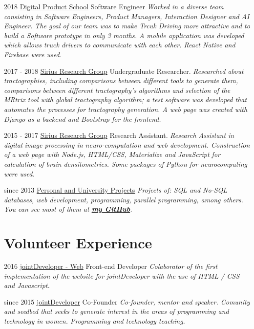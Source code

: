 \documentclass[]{friggeri-cv}
\begin{document}
\begin{entrylist}

    \entry
    {2018}
    {\href{https://www.digitalproductschool.io/index}{Digital Product School}}
    {Software Engineer}
    {\emph{Worked in a diverse team consisting in Software Engineers, Product Managers, Interaction Designer and  AI Engineer. The goal of our team was to make Trcuk Driving more attractive and to build a Software prototype in only 3 months.
    A mobile application was developed which allows truck drivers to communicate with each other. React Native and Firebase were used.
    }}
    
    \entry
    {2017 - 2018}
    {\href{http://judge.utp.edu.co/}{Sirius Research Group}}
    {Undergraduate Researcher.}
    {\emph{
    Researched about tractographies, including comparisons between different tools to generate them, comparisons between different tractography's algorithms and selection of the MRtrix tool with global tractography algorithm; a test software was developed that automates the processes for tractography generation. A web page was created with Django as a backend and Bootstrap for the frontend.
    }}
    
  \entry
    {2015 - 2017}
    {\href{http://judge.utp.edu.co/}{Sirius Research Group}}
    {Research Assistant.}
    {\emph{Research Assistant in digital image processing in neuro-computation and web development.
    Construction of a web page with Node.js, HTML/CSS, Materialize and JavaScript for calculation of brain densitometries. Some packages of Python for neurocomputing were used.
    }}
    
    \entry
    {since 2013}
    {\href{http://github.com/carolinajimenez26}{Personal and University Projects}}
    {}
    {\emph{Projects of: SQL and No-SQL databases, web development, programming, parallel programming, among others. You can see most of them at \textbf{\href{http://github.com/carolinajimenez26}{my GitHub}}.
    }}

    
\end{entrylist}

\section{Volunteer Experience}

\begin{entrylist}

\entry
    {2016}
    {\href{https://github.com/jointDeveloper/jointdeveloper.github.io}{jointDeveloper - Web}}
    {Front-end Developer}
    {\emph{Colaborator of the first implementation of the website for jointDeveloper with the use of HTML / CSS and Javascript.}}
    
    
\entry
    {since 2015}
    {\href{https://sirius.utp.edu.co/jointdeveloper/}{jointDeveloper}}
    {Co-Founder}
    {\emph{Co-founder, mentor and speaker. Comunity and seedbed that seeks to generate interest in the areas of programming and technology in women. Programming and technology teaching. 
    }}
    
\end{entrylist}
\end{document}

